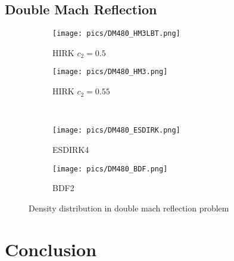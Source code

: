 \documentclass[preprint,12pt]{elsarticle}
\begin{document}
\subsection{Double Mach Reflection}

\begin{figure}[htbp]
    \centering
    \begin{subfigure}{0.5\textwidth}
        \texttt{[image: pics/DM480\_HM3LBT.png]}
        \caption[]{HIRK $c_2=0.5$}
        \label{sfig:DM480_HM3LBT}
    \end{subfigure}\hfill
    \begin{subfigure}{0.5\textwidth}
        \texttt{[image: pics/DM480\_HM3.png]}
        \caption[]{HIRK $c_2=0.55$}
        \label{sfig:DM480_HM3}
    \end{subfigure}\\
    \begin{subfigure}{0.5\textwidth}
        \texttt{[image: pics/DM480\_ESDIRK.png]}
        \caption[]{ESDIRK4}
        \label{sfig:DM480_ESDIRK4}
    \end{subfigure}\hfill
    \begin{subfigure}{0.5\textwidth}
        \texttt{[image: pics/DM480\_BDF.png]}
        \caption[]{BDF2}
        \label{sfig:DM480_BDF2}
    \end{subfigure}
    \caption{Density distribution in double mach reflection problem}
    \label{fig:DM480}
\end{figure}

\section{Conclusion}











\end{document}
